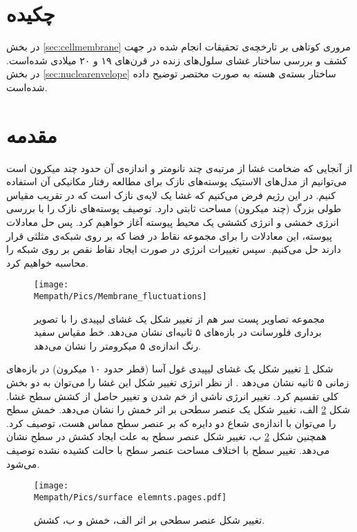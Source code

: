 \setRL
\clearpage
\def \MemModel {\Mempath /MembraneModel}

\section{
چکیده
}
در بخش
\ref{sec:cellmembrane}
مروری کوتاهی بر تارخچه‌ی تحقیقات انجام شده در جهت کشف و بررسی ساختار غشای سلول‌های زنده در قرن‌های ۱۹ و ۲۰ میلادی شده‌است. در بخش
\ref{sec:nuclearenvelope}
ساختار بسته‌ی هسته به صورت مختصر توضیح داده شده‌است.

\section{
مقدمه
}
از آنجایی که ضخامت غشا از مرتبه‌ی چند نانومتر و اندازه‌ی آن حدود چند میکرون است می‌توانیم از مدل‌های الاستیک پوسته‌های نازک برای مطالعه رفتار مکانیکی آن استفاده کنیم. در این رژیم فرض می‌کنیم که غشا یک لایه‌ی نازک است که در تقریب مقیاس طولی بزرگ (چند میکرون) مساحت ثابتی دارد. توصیف پوسته‌های نازک را با بررسی انرژی خمشی و انرژی کششی یک محیط پیوسته آغاز خواهیم کرد. پس حل معادلات پیوسته، این معادلات را برای مجموعه نقاط در فضا که بر روی شبکه‌ی مثلثی قرار دارند حل می‌کنیم. سپس تغییرات انرژی در صورت ایجاد نقاط نقص بر روی شبکه را محاسبه خواهیم کرد. 




\begin{figure}[h]
\begin{center}
\texttt{[image: \\Mempath/Pics/Membrane\_fluctuations]}
\caption{
مجموعه تصاویر پست سر هم از تغییر شکل یک غشای لیپیدی را با تصویر برداری فلورسانت در بازه‌های ۵ ثانیه‌ای نشان می‌دهد. خط مقیاس سفید رنگ اندازه‌ی ۵ میکرومتر را نشان می‌دهد. 
\cite{ParthasarathyMembraneMeasurement}
}
\label{fig:flucmem}
\end{center}
\end{figure}

شکل 
\ref{fig:flucmem}
تغییر شکل یک غشای لیپیدی غول آسا (قطر حدود ۱۰ میکرون) در بازه‌های زمانی ۵ ثانیه نشان می‌دهد
\cite{ParthasarathyMembraneMeasurement}
. از نظر انرژی تغییر شکل این غشا را می‌توان به دو بخش کلی تقسیم کرد. تغییر انرژی ناشی از خم شدن و تغییر حاصل از کشش سطح غشا. شکل
\ref{fig:elasticdeformation}
الف، تغییر شکل یک عنصر سطحی بر اثر خمش را نشان می‌دهد. خمش سطح را می‌توان با اندازه‌ی شعاع دو دایره که بر عنصر سطح مماس هست، توصیف کرد. همچنین شکل 
\ref{fig:elasticdeformation}
ب، تغییر شکل عنصر سطح به علت ایجاد کشش در سطح نشان می‌دهد. تغییر سطح با اختلاف مساحت عنصر سطح با حالت کشیده نشده توصیف می‌شود.
\begin{figure}[h]
\begin{center}
\texttt{[image: \\Mempath/Pics/surface elemnts.pages.pdf]}
\caption{
تغییر شکل عنصر سطحی بر اثر الف، خمش و ب، کشش.
}
\label{fig:elasticdeformation}
\end{center}
\end{figure}


